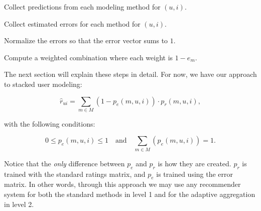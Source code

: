 \begin{enumerate*}
  \item Collect predictions from each modeling method for $(u,i)$.
  \item Collect estimated errors for each method for $(u,i)$.
  \item Normalize the errors so that the error vector sums to $1$.
  \item Compute a weighted combination where each weight is $1 - e_m$.
\end{enumerate*}

The next section will explain these steps in detail.
For now, we have our approach to stacked user modeling:

\begin{equation*}
  \hat{r}_{ui} = \sum_{m \in M} (1 - p_{e}(m,u,i)) \cdot p_r(m,u,i),
\end{equation*}

with the following conditions:

\begin{equation*}
  0 \leq p_{e}(m,u,i) \leq 1 \quad \text{and} \quad \sum_{m \in M} (p_{e}(m,u,i)) = 1.
\end{equation*}




Notice that the \emph{only} difference between $p_e$ and $p_r$ is how they are created.
$p_r$ is trained with the standard ratings matrix, and $p_e$ is trained using the error matrix.
In other words, through this approach we may use any recommender system for both 
the standard methods in level 1 and for the adaptive aggregation in level 2.


